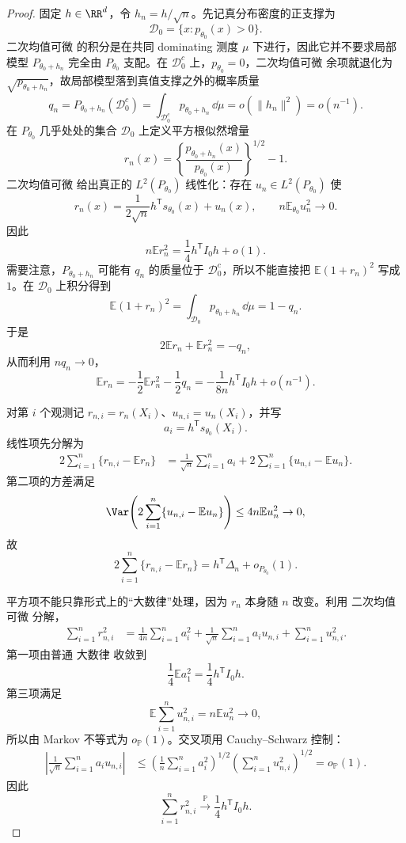 \begin{proof}
固定 $h\in\RR^d$，令 $h_n=h/\sqrt n$。先记真分布密度的正支撑为
\[
 \mathcal D_0=\{x:p_{\theta_0}(x)>0\}.
\]
二次均值可微 的积分是在共同 dominating 测度 $\mu$ 下进行，因此它并不要求局部模型 $P_{\theta_0+h_n}$ 完全由 $P_{\theta_0}$ 支配。在 $\mathcal D_0^c$ 上，$p_{\theta_0}=0$，二次均值可微 余项就退化为 $\sqrt{p_{\theta_0+h_n}}$，故局部模型落到真值支撑之外的概率质量
\[
 q_n
 =P_{\theta_0+h_n}(\mathcal D_0^c)
 =\int_{\mathcal D_0^c}p_{\theta_0+h_n}\,\dd\mu
 =o(\|h_n\|^2)
 =o(n^{-1}).
\]
在 $P_{\theta_0}$ 几乎处处的集合 $\mathcal D_0$ 上定义平方根似然增量
\[
 r_n(x)
 =\left\{\frac{p_{\theta_0+h_n}(x)}{p_{\theta_0}(x)}\right\}^{1/2}-1.
\]
二次均值可微 给出真正的 $L^2(P_{\theta_0})$ 线性化：存在 $u_n\in L^2(P_{\theta_0})$ 使
\[
 r_n(x)
 =\frac{1}{2\sqrt n}h^{\mathsf T}s_{\theta_0}(x)+u_n(x),
 \qquad
 n\mathbb E_{\theta_0}u_n^2\to0.
\]
因此
\[
 n\mathbb E r_n^2
 =\frac14h^{\mathsf T}I_0h+o(1).
\]
需要注意，$P_{\theta_0+h_n}$ 可能有 $q_n$ 的质量位于 $\mathcal D_0^c$，所以不能直接把 $\mathbb E(1+r_n)^2$ 写成 $1$。在 $\mathcal D_0$ 上积分得到
\[
 \mathbb E(1+r_n)^2
 =\int_{\mathcal D_0}p_{\theta_0+h_n}\,\dd\mu
 =1-q_n.
\]
于是
\[
 2\mathbb E r_n+\mathbb E r_n^2=-q_n,
\]
从而利用 $nq_n\to0$，
\[
 \mathbb E r_n
 =-\frac12\mathbb E r_n^2-\frac12q_n
 =-\frac{1}{8n}h^{\mathsf T}I_0h+o(n^{-1}).
\]

对第 $i$ 个观测记 $r_{n,i}=r_n(X_i)$、$u_{n,i}=u_n(X_i)$，并写
\[
 a_i=h^{\mathsf T}s_{\theta_0}(X_i).
\]
线性项先分解为
\begin{align*}
 2\sum_{i=1}^n\{r_{n,i}-\mathbb E r_n\}
 &=\frac1{\sqrt n}\sum_{i=1}^n a_i
 +2\sum_{i=1}^n\{u_{n,i}-\mathbb E u_n\}.
\end{align*}
第二项的方差满足
\[
 \Var\!\left(
 2\sum_{i=1}^n\{u_{n,i}-\mathbb E u_n\}
 \right)
 \le4n\mathbb E u_n^2\to0,
\]
故
\[
 2\sum_{i=1}^n\{r_{n,i}-\mathbb E r_n\}
 =h^{\mathsf T}\Delta_n+o_{P_{\theta_0}}(1).
\]

平方项不能只靠形式上的“大数律”处理，因为 $r_n$ 本身随 $n$ 改变。利用 二次均值可微 分解，
\begin{align*}
 \sum_{i=1}^nr_{n,i}^2
 &=\frac1{4n}\sum_{i=1}^na_i^2
 +\frac1{\sqrt n}\sum_{i=1}^na_i u_{n,i}
 +\sum_{i=1}^nu_{n,i}^2.
\end{align*}
第一项由普通 大数律 收敛到
\[
 \frac14\mathbb E a_1^2
 =\frac14h^{\mathsf T}I_0h.
\]
第三项满足
\[
 \mathbb E\sum_{i=1}^nu_{n,i}^2
 =n\mathbb E u_n^2\to0,
\]
所以由 Markov 不等式为 $o_{\mathbb P}(1)$。交叉项用 Cauchy--Schwarz 控制：
\begin{align*}
 \left|
 \frac1{\sqrt n}\sum_{i=1}^na_i u_{n,i}
 \right|
 &\le
 \left(\frac1n\sum_{i=1}^na_i^2\right)^{1/2}
 \left(\sum_{i=1}^nu_{n,i}^2\right)^{1/2}
 =o_{\mathbb P}(1).
\end{align*}
因此
\[
 \sum_{i=1}^nr_{n,i}^2
 \xrightarrow{\mathbb P}\frac14h^{\mathsf T}I_0h.
\]


\end{proof}
